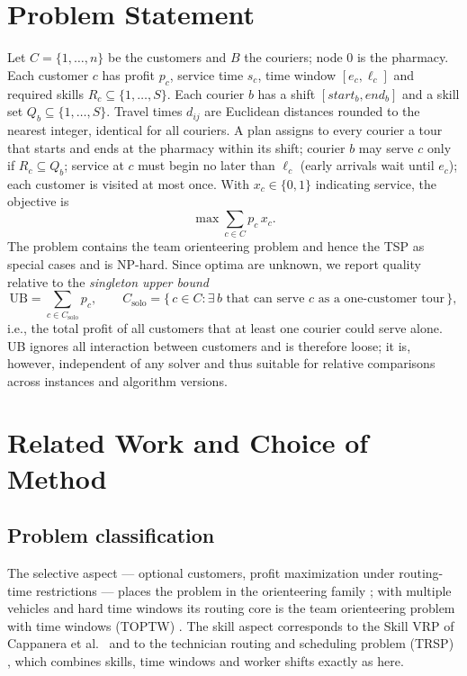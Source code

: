 \documentclass[10pt, a4paper]{article}
\begin{document}
\section{Problem Statement}\label{sec:problem}

Let $C=\{1,\dots,n\}$ be the customers and $B$ the couriers; node $0$ is the
pharmacy. Each customer $c$ has profit $p_c$, service time $s_c$, time window
$[e_c,\ell_c]$ and required skills $R_c\subseteq\{1,\dots,S\}$. Each courier
$b$ has a shift $[\mathit{start}_b,\mathit{end}_b]$ and a skill set
$Q_b\subseteq\{1,\dots,S\}$. Travel times $d_{ij}$ are Euclidean distances
rounded to the nearest integer, identical for all couriers. A plan assigns to
every courier a tour that starts and ends at the pharmacy within its shift;
courier $b$ may serve $c$ only if $R_c\subseteq Q_b$; service at $c$ must
begin no later than $\ell_c$ (early arrivals wait until $e_c$); each customer
is visited at most once. With $x_c\in\{0,1\}$ indicating service, the
objective is
\begin{equation}
  \max \sum_{c\in C} p_c\, x_c .
  \label{eq:objective}
\end{equation}
The problem contains the team orienteering problem and hence the TSP as
special cases and is NP-hard. Since optima are unknown, we report quality
relative to the \emph{singleton upper bound}
\begin{equation*}
\mathrm{UB}=\sum_{c\in C_{\mathrm{solo}}} p_c,
\qquad
C_{\mathrm{solo}}=\{\,c\in C : \exists\, b \text{ that can serve } c
\text{ as a one-customer tour}\,\},
\end{equation*}
i.e., the total profit of all customers that at least one courier could serve
alone. UB ignores all interaction between customers and is
therefore loose; it is, however, independent of any solver and thus suitable
for relative comparisons across instances and algorithm versions.

\section{Related Work and Choice of Method}\label{sec:related}

\subsection{Problem classification}
The selective aspect --- optional customers, profit maximization under
routing-time restrictions --- places the problem in the orienteering family
\cite{vansteenwegen2011}; with multiple vehicles and hard time windows its
routing core is the team orienteering problem with time windows (TOPTW)
\cite{labadie2012,gunawan2016}. The skill aspect corresponds to the Skill VRP
of Cappanera et al.~\cite{cappanera2011} and to the technician routing and
scheduling problem (TRSP) \cite{kovacs2012,pillac2013}, which combines
skills, time windows and worker shifts exactly as here.
\end{document}
